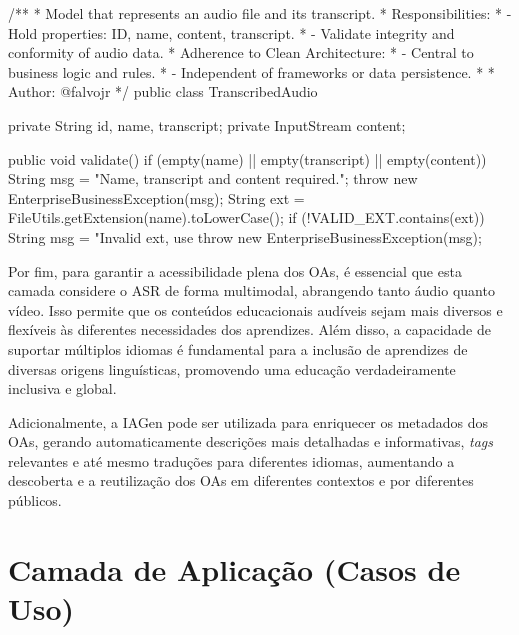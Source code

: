 \begin{codigo}[caption={Exemplo Camada de Entidades: Disponível em \url{https://bit.ly/S2L-Entity}}, label={codigo:exemplo-camada1}, language=Java, breaklines=true]
/**
 * Model that represents an audio file and its transcript.
 * Responsibilities:
 * - Hold properties: ID, name, content, transcript.
 * - Validate integrity and conformity of audio data.
 * Adherence to Clean Architecture:
 * - Central to business logic and rules.
 * - Independent of frameworks or data persistence.
 * 
 * Author: @falvojr
 */
public class TranscribedAudio {
  private String id, name, transcript;
  private InputStream content;

  public void validate() {
    if (empty(name) || empty(transcript) || empty(content)) {
      String msg =  "Name, transcript and content required.";
      throw new EnterpriseBusinessException(msg);
    }
    String ext = FileUtils.getExtension(name).toLowerCase();
    if (!VALID_EXT.contains(ext)) {
      String msg =  "Invalid ext, use %
      throw new EnterpriseBusinessException(msg);
    }
  }
}
\end{codigo}

Por fim, para garantir a acessibilidade plena dos OAs, é essencial que esta camada considere o ASR de forma multimodal, abrangendo tanto áudio quanto vídeo. Isso permite que os conteúdos educacionais audíveis sejam mais diversos e flexíveis às diferentes necessidades dos aprendizes. Além disso, a capacidade de suportar múltiplos idiomas é fundamental para a inclusão de aprendizes de diversas origens linguísticas, promovendo uma educação verdadeiramente inclusiva e global.

Adicionalmente, a IAGen pode ser utilizada para enriquecer os metadados dos OAs, gerando automaticamente descrições mais detalhadas e informativas, \textit{tags} relevantes e até mesmo traduções para diferentes idiomas, aumentando a descoberta e a reutilização dos OAs em diferentes contextos e por diferentes públicos.

\section{Camada de Aplicação (Casos de Uso)}

